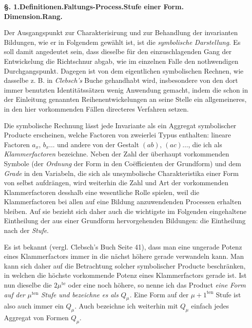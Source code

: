 \documentclass[10pt]{article}
\begin{document}
\begin{center}
{\bfseries §. 1.\quad Definitionen.\quad Faltungs-Process.\quad Stufe einer Form.\\ Dimension.\quad Rang.}
\end{center}

Der Ausgangspunkt zur Charakterisirung und zur Behandlung der invarianten Bildungen, wie er in Folgendem gewählt ist, ist die \emph{symbolische Darstellung}. Es soll damit angedeutet sein, dass dieselbe für den einzuschlagenden Gang der Entwickelung die Richtschnur abgab, wie im einzelnen Falle den nothwendigen Durchgangspunkt. Dagegen ist von dem eigentlichen symbolischen Rechnen, wie dasselbe z. B. in \emph{Clebsch's} Buche gehandhabt wird, insbesondere von den dort immer benutzten Identitätssätzen wenig Anwendung gemacht, indem die schon in der Einleitung genannten Reihenentwickelungen an seine Stelle ein allgemeineres, in den hier vorkommenden Fällen directeres Verfahren setzen.

Die symbolische Rechnung lässt jede Invariante als ein Aggregat symbolischer Producte erscheinen, welche Factoren von zweierlei Typus enthalten: lineare Factoren $a_x$, $b_x\ldots$ und andere von der Gestalt $(ab)$, $(ac)\ldots$, die ich als \emph{Klammerfactoren} bezeichne. Neben der Zahl der überhaupt vorkommenden Symbole (der \emph{Ordnung} der Form in den Coëfficienten der Grundform) und dem \emph{Grade} in den Variabeln, die sich als unsymbolische Charakteristika einer Form von selbst aufdrängen, wird weiterhin die Zahl und Art der vorkommenden Klammerfactoren desshalb eine wesentliche Rolle spielen, weil die Klammerfactoren bei allen auf eine Bildung anzuwendenden Processen erhalten bleiben. Auf sie bezieht sich daher auch die wichtigste im Folgenden eingehaltene Eintheilung der aus einer Grundform hervorgehenden Bildungen: die Eintheilung nach der \emph{Stufe}.

Es ist bekannt (vergl. Clebsch's Buch Seite 41), dass man eine ungerade Potenz eines Klammerfactors immer in die nächst höhere gerade verwandeln kann. Man kann sich daher auf die Betrachtung solcher symbolischer Producte beschränken, in welchen die höchste vorkommende Potenz eines Klammerfactors gerade ist. Ist nun dieselbe die $2\mu^{\mathrm{te}}$ oder eine noch höhere, so nenne ich das Product \emph{eine Form auf der $\mu^{\mathrm{ten}}$ Stufe und bezeichne es als $Q_\mu$.} Eine Form auf der $\mu+1^{\mathrm{ten}}$ Stufe ist also auch immer ein $Q_\mu$. Auch bezeichne ich weiterhin mit $Q_\mu$ einfach jedes Aggregat von Formen $Q_\mu$.
\end{document}

